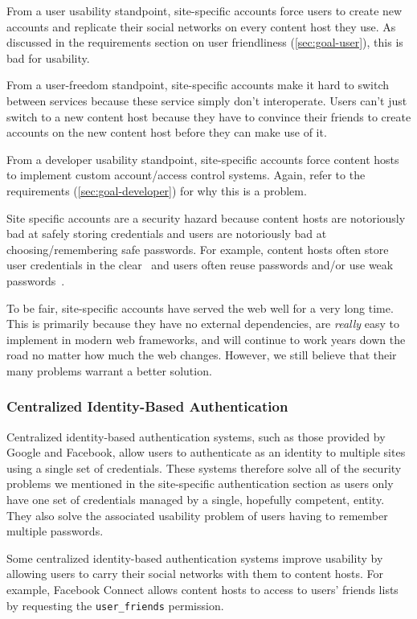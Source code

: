 \documentclass[pdftex,12pt,a4papaer,twoside,notitlepage]{report}
\begin{document}
From a user usability standpoint, site-specific accounts force users to create
new accounts and replicate their social networks on every content host they use.
As discussed in the requirements section on user friendliness (\cref{sec:goal-user}), this is bad for usability.

From a user-freedom standpoint, site-specific accounts make it hard to switch
between services because these service simply don't interoperate. Users can't
just switch to a new content host because they have to convince their friends to
create accounts on the new content host before they can make use of it.

From a developer usability standpoint, site-specific accounts force content
hosts to implement custom account/access control systems. Again, refer to the
requirements (\cref{sec:goal-developer}) for why this is a problem.

Site specific accounts are a security hazard because content hosts are
notoriously bad at safely storing credentials and users are notoriously bad at
choosing/remembering safe passwords. For example, content hosts often store user
credentials in the clear~\cite{plaintext} and users often reuse passwords and/or
use weak passwords~\cite{ms-passwords}.

To be fair, site-specific accounts have served the web well for a very long
time. This is primarily because they have no external dependencies, are
\emph{really} easy to implement in modern web frameworks, and will continue to
work years down the road no matter how much the web changes. However, we still
believe that their many problems warrant a better solution.

\subsubsection{Centralized Identity-Based Authentication}

Centralized identity-based authentication systems, such as those provided by
Google and Facebook, allow users to authenticate as an identity to multiple
sites using a single set of credentials. These systems therefore solve all of
the security problems we mentioned in the site-specific authentication section
as users only have one set of credentials managed by a single, hopefully
competent, entity. They also solve the associated usability problem of users
having to remember multiple passwords.

Some centralized identity-based authentication systems improve usability by
allowing users to carry their social networks with them to content hosts. For
example, Facebook Connect allows content hosts to access to users' friends lists
by requesting the \verb=user_friends=
permission\cite{facebook-connect-user-friends}.
\end{document}
